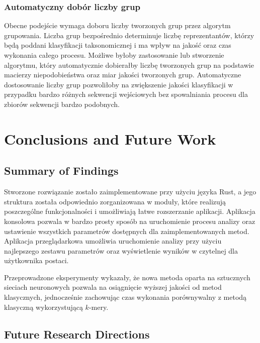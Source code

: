 \documentclass{article}
\newcommand{\temporary}[1]{
    \begin{tcolorbox}[colframe=red, colback=white, title={\textbf{WERSJA PO POLSKU}}, sharp corners=south]
        #1
    \end{tcolorbox}
}
\begin{document}
{        \subsubsection{Automatyczny dobór liczby grup}

            Obecne podejście wymaga doboru liczby tworzonych grup przez algorytm grupowania. Liczba grup bezpośrednio determinuje liczbę reprezentantów, którzy będą poddani klasyfikacji taksonomicznej i ma wpływ na jakość oraz czas wykonania całego procesu. Możliwe byłoby zastosowanie lub stworzenie algorytmu, który automatycznie dobierałby liczbę tworzonych grup na podstawie macierzy niepodobieństwa oraz miar jakości tworzonych grup. Automatyczne dostosowanie liczby grup pozwoliłoby na zwiększenie jakości klasyfikacji w przypadku bardzo różnych sekwencji wejściowych bez spowalniania procesu dla zbiorów sekwencji bardzo podobnych.
            }

    \section{Conclusions and Future Work}

        \subsection{Summary of Findings}

            \temporary{
                Stworzone rozwiązanie zostało zaimplementowane przy użyciu języka Rust, a jego struktura została odpowiednio zorganizowana w moduły, które realizują poszczególne funkcjonalności i umożliwiają łatwe rozszerzanie aplikacji. Aplikacja konsolowa pozwala w bardzo prosty sposób na uruchomienie procesu analizy oraz ustawienie wszystkich parametrów dostępnych dla zaimplementowanych metod. Aplikacja przeglądarkowa umożliwia uruchomienie analizy przy użyciu najlepszego zestawu parametrów oraz wyświetlenie wyników w czytelnej dla użytkownika postaci.

                Przeprowadzone eksperymenty wykazały, że nowa metoda oparta na sztucznych sieciach neuronowych pozwala na osiągnięcie wyższej jakości od metod klasycznych, jednocześnie zachowując czas wykonania porównywalny z metodą klasyczną wykorzystującą $k$-mery.
            }

        \subsection{Future Research Directions}
\end{document}
